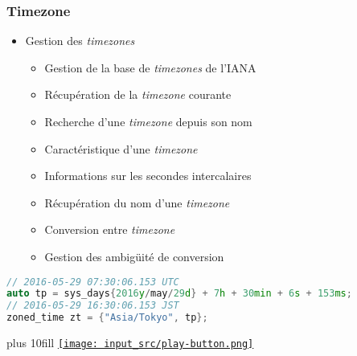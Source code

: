 \documentclass[C++.tex]{subfiles}
\begin{document}
\begin{frame}[fragile]
	\frametitle{Timezone}
	\begin{itemize}
		\item Gestion des \textit{timezones}
		\begin{itemize}
			\item Gestion de la base de \textit{timezones} de l'IANA


			\item Récupération de la \textit{timezone} courante
			\item Recherche d'une \textit{timezone} depuis son nom
			\item Caractéristique d'une \textit{timezone}
			\item Informations sur les secondes intercalaires
			\item Récupération du nom d'une \textit{timezone}
			\item Conversion entre \textit{timezone}
			\item Gestion des ambigüité de conversion
		\end{itemize}
	\end{itemize}

	\begin{lstlisting}[language=C++]
// 2016-05-29 07:30:06.153 UTC
auto tp = sys_days{2016y/may/29d} + 7h + 30min + 6s + 153ms; 
// 2016-05-29 16:30:06.153 JST
zoned_time zt = {"Asia/Tokyo", tp};\end{lstlisting}

	\vskip 10mm plus 10fill
	\hfill
	\href{https://godbolt.org/#g:!((g:!((g:!((h:codeEditor,i:(filename:'1',fontScale:14,fontUsePx:'0',j:1,lang:c%2B%2B,selection:(endColumn:1,endLineNumber:15,positionColumn:1,positionLineNumber:15,selectionStartColumn:1,selectionStartLineNumber:1,startColumn:1,startLineNumber:1),source:'%23include+%3Ciostream%3E%0A%23include+%3Cchrono%3E%0A%23include+%3Cformat%3E%0A%0Ausing+namespace+std::literals::chrono_literals%3B%0A%0Aint+main()%0A%7B%0A++auto+tp+%3D+std::chrono::sys_days%7B2016y/std::chrono::May/29d%7D+%2B+7h+%2B+30min+%2B+6s+%2B+153ms%3B+%0A++std::chrono::zoned_time+zt+%3D+%7B%22Asia/Tokyo%22,+tp%7D%3B%0A%0A++std::cout+%3C%3C+std::format(%22%7B:%25F+%25T%7D%22,+tp)+%3C%3C+%22%5Cn%22%3B%0A++std::cout+%3C%3C+std::format(%22%7B:%25F+%25T%7D%22,+zt)+%3C%3C+%22%5Cn%22%3B%0A%7D%0A'),l:'5',n:'0',o:'C%2B%2B+source+%231',t:'0')),k:50,l:'4',n:'0',o:'',s:0,t:'0'),(g:!((h:executor,i:(argsPanelShown:'1',compilationPanelShown:'0',compiler:gsnapshot,compilerName:'',compilerOutShown:'0',execArgs:'',execStdin:'',fontScale:14,fontUsePx:'0',j:1,lang:c%2B%2B,libs:!((name:boost,ver:'175')),options:'-std%3Dc%2B%2B20+-Wall+-Wextra+-pedantic',source:1,stdinPanelShown:'1',tree:'1',wrap:'0'),l:'5',n:'0',o:'Executor+x86-64+gcc+(trunk)+(C%2B%2B,+Editor+%231)',t:'0')),header:(),k:50,l:'4',n:'0',o:'',s:0,t:'0')),l:'2',n:'0',o:'',t:'0')),version:4}{\texttt{[image: input\_src/play-button.png]}}
\end{frame}
\end{document}
